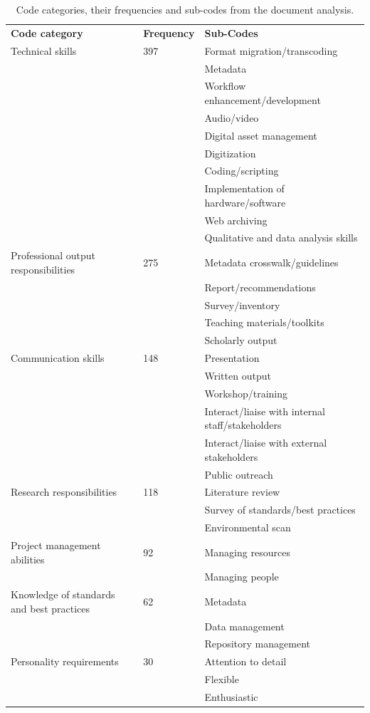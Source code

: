 \documentclass{acm_proc_article-sp}
\begin{document}
\begin{table}[t!]
\caption{Code categories, their frequencies and sub-codes from the document analysis.}
\begin{tabular}{lll}
\textbf{Code category} & \textbf{Frequency} & \textbf{Sub-Codes} \\
Technical skills & 397 & Format migration/transcoding \\
\multicolumn{2}{l}{\multirow{9}{*}{}} & Metadata \\
\multicolumn{2}{l}{} & Workflow enhancement/development \\
\multicolumn{2}{l}{} & Audio/video \\
\multicolumn{2}{l}{} & Digital asset management \\
\multicolumn{2}{l}{} & Digitization \\
\multicolumn{2}{l}{} & Coding/scripting \\
\multicolumn{2}{l}{} & Implementation of hardware/software \\
\multicolumn{2}{l}{} & Web archiving \\
\multicolumn{2}{l}{} & Qualitative and data analysis skills \\
Professional output responsibilities & 275 & Metadata crosswalk/guidelines \\
\multicolumn{2}{l}{\multirow{4}{*}{}} & Report/recommendations \\
\multicolumn{2}{l}{} & Survey/inventory \\
\multicolumn{2}{l}{} & Teaching materials/toolkits \\
\multicolumn{2}{l}{} & Scholarly output \\
Communication skills & 148 & Presentation \\
\multicolumn{2}{l}{\multirow{5}{*}{}} & Written output \\
\multicolumn{2}{l}{} & Workshop/training \\
\multicolumn{2}{l}{} & Interact/liaise with internal staff/stakeholders \\
\multicolumn{2}{l}{} & Interact/liaise with external stakeholders \\
\multicolumn{2}{l}{} & Public outreach \\
Research responsibilities & 118 & Literature review \\
\multicolumn{2}{l}{\multirow{2}{*}{}} & Survey of standards/best practices \\
\multicolumn{2}{l}{} & Environmental scan \\
Project management abilities & 92 & Managing resources \\
\multicolumn{2}{l}{} & Managing people \\
Knowledge of standards and best practices & 62 & Metadata \\
\multicolumn{2}{l}{\multirow{2}{*}{}} & Data management \\
\multicolumn{2}{l}{} & Repository management \\
Personality requirements & 30 & Attention to detail \\
 &  & Flexible \\
 &  & Enthusiastic
\end{tabular}
\label{my-label}
\end{table}
\end{document}
